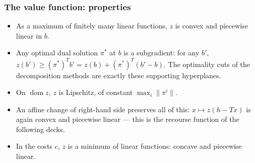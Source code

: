 \documentclass[aspectratio=169]{beamer}
\providecommand{\red}{\color{red}}
\begin{document}
\begin{frame}
\frametitle{The value function: properties}

\begin{itemize}
	\item
	As a maximum of finitely many linear functions, $z$ is {\red convex and piecewise linear} in $b$.
	\item
	Any optimal dual solution $\pi^*$ at $b$ is a {\red subgradient}: for any $b'$, $z(b') \geq (\pi^*)^Tb' = z(b) + (\pi^*)^T(b'-b)$.
	The optimality cuts of the decomposition methods are exactly these supporting hyperplanes.
	\item
	On $\operatorname{dom} z$, $z$ is {\red Lipschitz}, of constant $\max_i \lVert \pi^i \rVert$.
	\item
	An affine change of right-hand side preserves all of this: $x \mapsto z(h-Tx)$ is again convex and piecewise linear --- this is the {\red recourse function} of the following decks.
	\item
	In the costs $c$, $z$ is a minimum of linear functions: {\red concave and piecewise linear}.
\end{itemize}

\end{frame}
\end{document}
